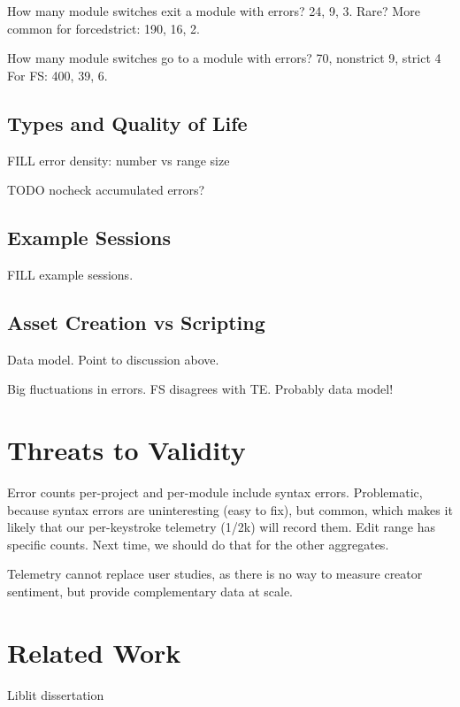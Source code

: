 \documentclass[english,submission,cleveref]{programming}
\begin{document}
How many module switches exit a module with errors?
\mnocheck{} 24, \mnonstrict{} 9, \mstrict{} 3.
Rare?
More common for forcedstrict:
 \mnocheck{} 190, \mnonstrict{} 16, \mstrict{} 2.

How many module switches go to a module with errors?
\mnocheck{} 70, nonstrict 9, strict 4
For FS: \mnocheck{} 400, \mnonstrict{} 39, \mstrict{} 6.


\subsection{Types and Quality of Life}

FILL error density: number vs range size

TODO nocheck accumulated errors?


\subsection{Example Sessions}

FILL example sessions.


\subsection{Asset Creation vs Scripting}

Data model. Point to discussion above.

Big fluctuations in errors.
FS disagrees with TE.
Probably data model!


\section{Threats to Validity}
\label{s:threats}

Error counts per-project and per-module include syntax errors.
Problematic, because syntax errors are uninteresting (easy to fix),
but common, which makes it likely that our per-keystroke telemetry (1/2k) will record them.
Edit range has specific counts.
Next time, we should do that for the other aggregates.

Telemetry cannot replace user studies, as there is no way to measure
creator sentiment, but provide complementary data at scale.


\section{Related Work}
\label{s:related}

Liblit dissertation~\cite{liblit-thesis}
\end{document}

